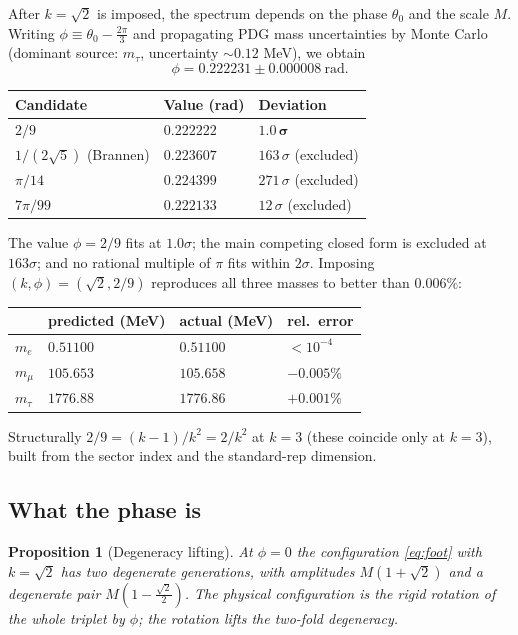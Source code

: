 \documentclass[12pt]{article}
\newtheorem{proposition}[theorem]{Proposition}
\theoremstyle{definition}
\theoremstyle{remark}
\begin{document}
After $k=\sqrt2$ is imposed, the spectrum depends on the phase $\theta_0$ and
the scale $M$. Writing $\phi\equiv\theta_0-\tfrac{2\pi}{3}$ and propagating
PDG mass uncertainties by Monte Carlo (dominant source: $m_\tau$, uncertainty
$\sim0.12$ MeV), we obtain
\begin{equation}
\phi=0.222231\pm0.000008\ \mathrm{rad}.
\end{equation}

\begin{center}
\begin{tabular}{lll}\toprule
Candidate & Value (rad) & Deviation\\\midrule
$2/9$ & $0.222222$ & $\mathbf{1.0\,\sigma}$\\
$1/(2\sqrt5)$ (Brannen) & $0.223607$ & $163\,\sigma$ (excluded)\\
$\pi/14$ & $0.224399$ & $271\,\sigma$ (excluded)\\
$7\pi/99$ & $0.222133$ & $12\,\sigma$ (excluded)\\\bottomrule
\end{tabular}
\end{center}

The value $\phi=2/9$ fits at $1.0\sigma$; the main competing closed form is
excluded at $163\sigma$; and no rational multiple of $\pi$ fits within
$2\sigma$. Imposing $(k,\phi)=(\sqrt2,2/9)$ reproduces all three masses to
better than $0.006\%$:

\begin{center}
\begin{tabular}{llll}\toprule
 & predicted (MeV) & actual (MeV) & rel.\ error\\\midrule
$m_e$ & $0.51100$ & $0.51100$ & $<10^{-4}$\\
$m_\mu$ & $105.653$ & $105.658$ & $-0.005\%$\\
$m_\tau$ & $1776.88$ & $1776.86$ & $+0.001\%$\\\bottomrule
\end{tabular}
\end{center}

Structurally $2/9=(k-1)/k^2=2/k^2$ at $k=3$ (these coincide only at $k=3$),
built from the sector index and the standard-rep dimension.

\subsection{What the phase is}

\begin{proposition}[Degeneracy lifting]
At $\phi=0$ the configuration \eqref{eq:foot} with $k=\sqrt2$ has two
degenerate generations, with amplitudes $M(1+\sqrt2)$ and a degenerate pair
$M(1-\tfrac{\sqrt2}{2})$. The physical configuration is the rigid rotation of
the whole triplet by $\phi$; the rotation lifts the two-fold degeneracy.
\end{proposition}
\end{document}

